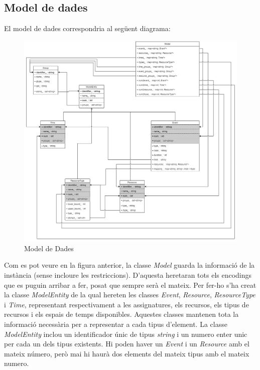 \documentclass[11pt,a4paper,twoside]{report}
\begin{document}
  \subsection{Model de dades}

  El model de dades correspondria al següent diagrama:
  \begin{figure}[H]
    \includegraphics[width=\textwidth]{Diagrames/ModelDades.png}
    \caption{Model de Dades}
    \label{fig:DataModel}
  \end{figure}

  Com es pot veure en la figura anterior, la classe \textit{Model} guarda la informació de la instància (sense incloure les restriccions). D'aquesta heretaran tots els encodings que es puguin arribar a fer, posat que sempre serà el mateix.
  Per fer-ho s'ha creat la classe \textit{ModelEntity} de la qual hereten les classes \textit{Event}, \textit{Resource}, \textit{ResourceType} i \textit{Time},
  representant respectivament a les assignatures, els recursos, els tipus de recursos i els espais de temps disponibles. Aquestes classes mantenen tota la informació necessària per a representar a cada tipus d'element. La classe \textit{ModelEntity}
  inclou un identificador  únic de tipus \textit{string} i un numero enter unic per cada un dels tipus existents. Hi poden haver un \textit{Event} i un \textit{Resource} amb el mateix número, però mai hi haurà dos elements del mateix tipus amb el mateix numero.
\end{document}
